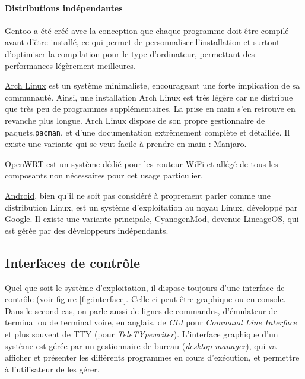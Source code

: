 \paragraph{Distributions indépendantes}

\href{https://www.gentoo.org}{Gentoo} a été créé avec la conception que chaque programme doit être compilé avant d'être installé, ce qui permet de personnaliser l'installation et surtout d'optimiser la compilation pour le type d'ordinateur, permettant des performances légèrement meilleures.

\href{https://www.archlinux.org}{Arch Linux} est un système minimaliste, encourageant une forte implication de sa communauté. Ainsi, une installation Arch Linux est très légère car ne distribue que très peu de programmes supplémentaires. La prise en main s'en retrouve en revanche plus longue. Arch Linux dispose de son propre gestionnaire de paquets,\texttt{pacman}, et d'une documentation extrêmement complète et détaillée. Il existe une variante qui se veut facile à prendre en main : \href{https://manjaro.org}{Manjaro}.

\href{https://openwrt.org}{OpenWRT} est un système dédié pour les routeur WiFi et allégé de tous les composants non nécessaires pour cet usage particulier.

\href{https://www.android.com}{Android}, bien qu'il ne soit pas considéré à proprement parler comme une distribution Linux, est un système d'exploitation au noyau Linux, développé par Google. Il existe une variante principale, CyanogenMod, devenue \href{https://lineageos.org}{LineageOS}, qui est gérée par des développeurs indépendants.

\newpage

\subsection{Interfaces de contrôle}\vspace{-4mm}

Quel que soit le système d'exploitation, il dispose toujours d'une interface de contrôle (voir figure \ref{fig:interface}. Celle-ci peut être graphique ou en console. Dans le second cas, on parle aussi de lignes de commandes, d'émulateur de terminal ou de terminal voire, en anglais, de \textit{CLI} pour \textit{Command Line Interface} et plus souvent de TTY (pour \textit{TeleTYpewriter}). L'interface graphique d'un système est gérée par un gestionnaire de bureau (\textit{desktop manager}), qui va afficher et présenter les différents programmes en cours d'exécution, et permettre à l'utilisateur de les gérer.

